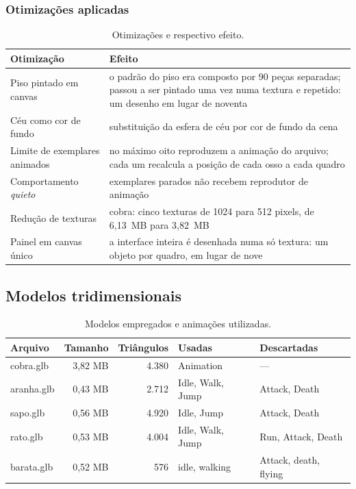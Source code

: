 \subsubsection{Otimizações aplicadas}

\begin{table}[htbp]
\centering
\caption{Otimizações e respectivo efeito.}
\label{tab:otimizacoes}
\begin{tabular}{p{4.2cm}p{8.4cm}}
\toprule
\textbf{Otimização} & \textbf{Efeito} \\
\midrule
Piso pintado em canvas &
o padrão do piso era composto por 90 peças separadas; passou a ser
pintado uma vez numa textura e repetido: um desenho em lugar de noventa \\
Céu como cor de fundo &
substituição da esfera de céu por cor de fundo da cena \\
Limite de exemplares animados &
no máximo oito reproduzem a animação do arquivo; cada um recalcula a
posição de cada osso a cada quadro \\
Comportamento \emph{quieto} &
exemplares parados não recebem reprodutor de animação \\
Redução de texturas &
cobra: cinco texturas de 1024 para 512 pixels, de 6,13~MB para 3,82~MB \\
Painel em canvas único &
a interface inteira é desenhada numa só textura: um objeto por quadro,
em lugar de nove \\
\bottomrule
\end{tabular}
\end{table}

\subsection{Modelos tridimensionais}

\begin{table}[htbp]
\centering
\caption{Modelos empregados e animações utilizadas.}
\label{tab:modelos}
\begin{tabular}{lrrll}
\toprule
\textbf{Arquivo} & \textbf{Tamanho} & \textbf{Triângulos} & \textbf{Usadas} & \textbf{Descartadas} \\
\midrule
cobra.glb  & 3,82 MB & 4.380 & Animation   & --- \\
aranha.glb & 0,43 MB & 2.712 & Idle, Walk, Jump & Attack, Death \\
sapo.glb   & 0,56 MB & 4.920 & Idle, Jump  & Attack, Death \\
rato.glb   & 0,53 MB & 4.004 & Idle, Walk, Jump & Run, Attack, Death \\
barata.glb & 0,52 MB & 576   & idle, walking & Attack, death, flying \\
\bottomrule
\end{tabular}
\end{table}

